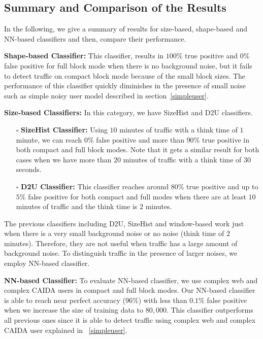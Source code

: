 \subsection{Summary and Comparison of the Results}
 In the following, we give a summary of results for size-based, shape-based and NN-based classifiers and then, compare their performance.
\begin{compactitem}
\item \textbf{Shape-based Classifier:} This classifier, results in $100\%$ true positive and $0\%$ false positive for full block mode when there is no background noise, but it fails to detect \bc traffic on compact block mode because of the small block sizes. The performance of this classifier quickly diminishes in the presence of small noise such as simple noisy user model described in section~\ref{simpleuser}.
\item \textbf{Size-based Classifiers:} 
In this category, we have SizeHist and D2U classifiers.
\begin{itemize}
\item[$\square$] \textbf{SizeHist Classifier:}
Using $10$ minutes of traffic with a think time of $1$ minute, we can reach $0\%$ false positive and more than $90\%$ true positive in both compact and full block modes. Note that it gets a similar result for both cases when we have more than $20$ minutes of 
traffic with a think time of $30$ seconds. 



\item[$\square$] \textbf{D2U Classifier:}
This classifier reaches around $80\%$ true positive and up to $5\%$ false positive for both compact and full modes when there are at least $10$ minutes of traffic and the think time is $2$ minutes. 
\end{itemize}

The previous classifiers including D2U, SizeHist and window-based work just when there is a very small background noise or no noise (think time of $2$ minutes). Therefore, they are not useful when \bc traffic has a large amount of background noise. To distinguish \bc traffic in the presence of larger noises, we employ NN-based classifier.
\item \textbf{NN-based Classifier:}
To evaluate NN-based classifier, we use complex web and complex CAIDA users in compact and full block modes. Our NN-based classifier is able to reach near perfect accuracy ($96\%$) with less than $0.1\%$ false positive when we increase the size of training data to $80,000$. This classifier outperforms all previous ones since it is able to detect \bc traffic using complex web and complex CAIDA user explained in ~\ref{simpleuser}.
\end{compactitem}
